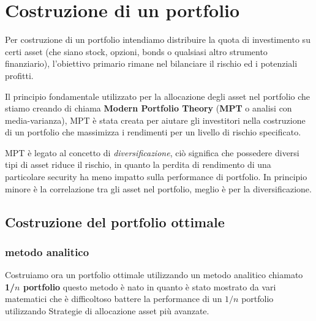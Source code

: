\section{Costruzione di un portfolio}

Per costruzione di un portfolio intendiamo distribuire la quota di investimento su certi asset (che siano stock, opzioni, bonds o qualsiasi altro strumento finanziario), l'obiettivo primario rimane nel bilanciare il rischio ed i potenziali profitti.

Il principio fondamentale utilizzato per la allocazione degli asset nel portfolio che stiamo creando di chiama \textbf{Modern Portfolio Theory} (\textbf{MPT} o analisi con media-varianza), MPT è stata creata
per aiutare gli investitori nella costruzione di un portfolio che massimizza i rendimenti per un livello di rischio specificato.

MPT è legato al concetto di \emph{diversificazione}, ciò significa che possedere diversi tipi di asset riduce il rischio, in quanto la perdita di rendimento di una particolare security ha meno impatto
sulla performance di portfolio. In principio minore è la correlazione tra gli asset nel portfolio, meglio è per la diversificazione.

\subsection{Costruzione del portfolio ottimale}

\subsubsection{metodo analitico}

Costruiamo ora un portfolio ottimale utilizzando un metodo analitico chiamato \textbf{1/$n$ portfolio} questo metodo è nato
in quanto è stato mostrato da vari matematici che è difficoltoso battere la performance di un $1/n$ portfolio utilizzando Strategie
di allocazione asset più avanzate.